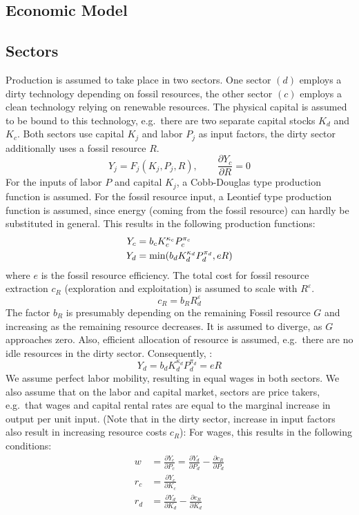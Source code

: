 \subsection{Economic Model}


\subsection{Sectors}

Production is assumed to take place in two sectors. One sector $(d)$ employs a dirty technology depending on fossil resources, the other sector $(c)$ employs a clean technology relying on renewable resources. The physical capital is assumed to be bound to this technology, e.g.\ there are two separate capital stocks $K_d$ and $K_c$. Both sectors use capital $K_j$ and labor $P_j$ as input factors, the dirty sector additionally uses a fossil resource $R$.
\begin{equation}
	Y_j = F_j(K_j,P_j,R), \qquad \frac{\partial Y_c}{\partial R} = 0 	
	\label{eq:production}
\end{equation}
For the inputs of labor $P$ and capital $K_j$, a Cobb-Douglas type production function is assumed. For the fossil resource input, a Leontief type production function is assumed, since energy (coming from the fossil resource) can hardly be substituted in general. This results in the following production functions:
\begin{align}
	Y_c &= b_c K_c^{\kappa_c} P_c^{\pi_c} \\
	Y_d &= {\rm min}(b_d K_d^{\kappa_d} P_d ^{\pi_d}, e R)
\end{align}
where $e$ is the fossil resource efficiency.
The total cost for fossil resource extraction $c_R$ (exploration and exploitation) is assumed to scale with $R^{\varepsilon}$.
\begin{equation}
	c_R = b_R R_d^{\varepsilon}
	\label{resource_extraction_cost}
\end{equation}
The factor $b_R$ is presumably depending on the remaining Fossil resource $G$ and increasing as the remaining resource decreases. It is assumed to diverge, as $G$ approaches zero. Also, efficient allocation of resource is assumed, e.g.\ there are no idle resources in the dirty sector. Consequently, :
\begin{equation}
	Y_d = b_d K_d^{\kappa_d} P_d^{\pi_d} = e R
	\label{efficient_resource_extraction}
\end{equation}
We assume perfect labor mobility, resulting in equal wages in both sectors. We also assume that on the labor and capital market, sectors are price takers, e.g.\ that wages and capital rental rates are equal to the marginal increase in output per unit input. (Note that in the dirty sector, increase in input factors also result in increasing resource costs $c_R$):
For wages, this results in the following conditions:
\begin{align}
	w &= \frac{\partial Y_c}{\partial P_c} = \frac{\partial Y_d}{\partial P_d} - \frac{\partial c_R}{\partial P_d}\\
	r_c &= \frac{\partial Y_c}{\partial K_c}\\
	r_d &= \frac{\partial Y_d}{\partial K_d} - \frac{\partial c_R}{\partial K_d}
\end{align}

